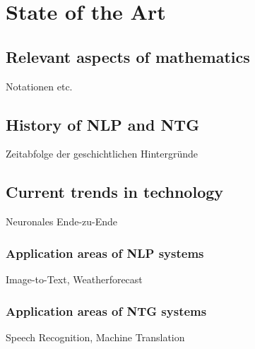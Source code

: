 \chapter{State of the Art}\label{ch:data}

\section{Relevant aspects of mathematics}

Notationen etc.

\section{History of NLP and NTG}

Zeitabfolge der geschichtlichen Hintergründe

\section{Current trends in technology}

Neuronales Ende-zu-Ende

\subsection{Application areas of NLP systems}
Image-to-Text, Weatherforecast

\subsection{Application areas of NTG systems}
Speech Recognition, Machine Translation